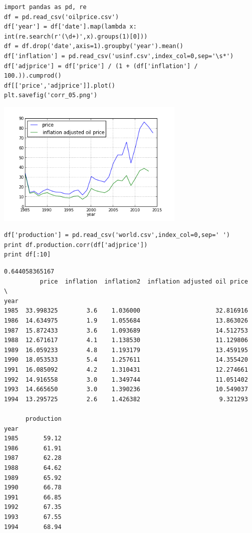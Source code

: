 \documentclass[12pt,fleqn]{article}\usepackage{../common}
\begin{document}
\begin{verbatim}
import pandas as pd, re
df = pd.read_csv('oilprice.csv')
df['year'] = df['date'].map(lambda x: int(re.search(r'(\d+)',x).groups(1)[0]))
df = df.drop('date',axis=1).groupby('year').mean()
df['inflation'] = pd.read_csv('usinf.csv',index_col=0,sep='\s*')
df['adjprice'] = df['price'] / (1 + (df['inflation'] / 100.)).cumprod()
df[['price','adjprice']].plot()
plt.savefig('corr_05.png')
\end{verbatim}

\includegraphics[height=6cm]{corr_05.png}

\begin{verbatim}
df['production'] = pd.read_csv('world.csv',index_col=0,sep=' ')
print df.production.corr(df['adjprice'])
print df[:10]
\end{verbatim}

\begin{verbatim}
0.644058365167
          price  inflation  inflation2  inflation adjusted oil price  \
year                                                                   
1985  33.998325        3.6    1.036000                     32.816916   
1986  14.634975        1.9    1.055684                     13.863026   
1987  15.872433        3.6    1.093689                     14.512753   
1988  12.671617        4.1    1.138530                     11.129806   
1989  16.059233        4.8    1.193179                     13.459195   
1990  18.053533        5.4    1.257611                     14.355420   
1991  16.085092        4.2    1.310431                     12.274661   
1992  14.916558        3.0    1.349744                     11.051402   
1993  14.665650        3.0    1.390236                     10.549037   
1994  13.295725        2.6    1.426382                      9.321293   

      production  
year              
1985       59.12  
1986       61.91  
1987       62.28  
1988       64.62  
1989       65.92  
1990       66.78  
1991       66.85  
1992       67.35  
1993       67.55  
1994       68.94  
\end{verbatim}
\end{document}
